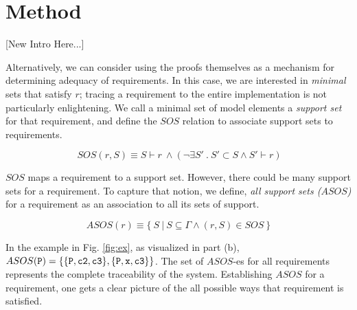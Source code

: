\section{Method}
\label{sec:method}



[New Intro Here...]

Alternatively, we can consider using the proofs themselves as a mechanism for determining adequacy of requirements.  In this case, we are interested in {\em minimal} sets that satisfy $r$; tracing a requirement to the entire implementation is not particularly enlightening.  We call a minimal set of model elements a \emph{support set} for that requirement, and define the $SOS$ relation to associate support sets to requirements.

$$ \ SOS(r, S) \equiv S \vdash r~ \land   (\neg\exists S'\ .\ S' \subset S \wedge S' \vdash r) $$

$SOS$ maps a requirement to a support set. However, there could be many support sets for a requirement. To capture that notion, we define, \emph{all support sets ($ASOS$)} for a requirement as an association to all its sets of support.


$$ ASOS(r) \equiv  \{\ S~|~S \subseteq \Gamma \land (r,S) \in SOS\ \} $$

In the example in Fig. \ref{fig:ex}, as visualized in part (b),
$ASOS ({\tt P}) = \{\{{\tt P}, {\tt c2}, {\tt c3}\}, \{{\tt P}, {\tt x}, {\tt c3}\}\}$. The set of $ASOS$-es for all requirements represents the complete traceability of the system. Establishing $ASOS$ for a requirement, one gets a clear picture of the all possible ways that requirement is satisfied.


